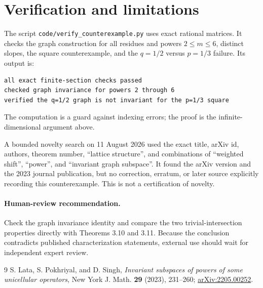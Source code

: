 \documentclass[11pt]{article}
\begin{document}
\section{Verification and limitations}

The script \texttt{code/verify\_counterexample.py} uses exact rational
matrices.  It checks the graph construction for all residues and powers
$2\leq m\leq6$, distinct slopes, the square counterexample, and the
$q=1/2$ versus $p=1/3$ failure.  Its output is:
\begin{verbatim}
all exact finite-section checks passed
checked graph invariance for powers 2 through 6
verified the q=1/2 graph is not invariant for the p=1/3 square
\end{verbatim}
The computation is a guard against indexing errors; the proof is the
infinite-dimensional argument above.

A bounded novelty search on 11 August 2026 used the exact title, arXiv id,
authors, theorem number, ``lattice structure'', and combinations of
``weighted shift'', ``power'', and ``invariant graph subspace''.  It found
the arXiv version and the 2023 journal publication, but no correction,
erratum, or later source explicitly recording this counterexample.  This is
not a certification of novelty.

\paragraph{Human-review recommendation.}
Check the graph invariance identity and compare the two trivial-intersection
properties directly with Theorems 3.10 and 3.11.  Because the conclusion
contradicts published characterization statements, external use should wait
for independent expert review.

\begin{thebibliography}{9}
S. Lata, S. Pokhriyal, and D. Singh,
\emph{Invariant subspaces of powers of some unicellular operators},
New York J. Math. \textbf{29} (2023), 231--260;
\href{https://arxiv.org/abs/2205.00252}{arXiv:2205.00252}.
\end{thebibliography}
\end{document}
